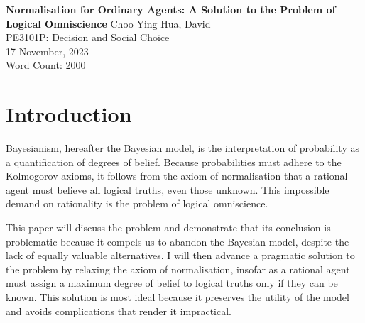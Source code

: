 \documentclass[12pt]{article}
\renewcommand{\maketitle}{%
    \begin{titlepage}
        \begin{center}
            \vfill
            \vspace*{\baselineskip}
            \vfill
            \textbf{Normalisation for Ordinary Agents: A Solution to the Problem of Logical Omniscience}
            \vfill
            Choo Ying Hua, David\\
            PE3101P: Decision and Social Choice\\
            17 November, 2023\\
            Word Count: 2000
            \vfill
        \end{center}
    \end{titlepage}
    }
\begin{document}
\maketitle
\section{Introduction}
Bayesianism, hereafter the Bayesian model, is the interpretation of probability as a quantification of degrees of belief. Because probabilities must adhere to the Kolmogorov axioms, it follows from the axiom of normalisation that a rational agent must believe all logical truths, even those unknown. This impossible demand on rationality is the problem of logical omniscience.

This paper will discuss the problem and demonstrate that its conclusion is problematic because it compels us to abandon the Bayesian model, despite the lack of equally valuable alternatives. I will then advance a pragmatic solution to the problem by relaxing the axiom of normalisation, insofar as a rational agent must assign a maximum degree of belief to logical truths only if they can be known. This solution is most ideal because it preserves the utility of the model and avoids complications that render it impractical.
\end{document}
